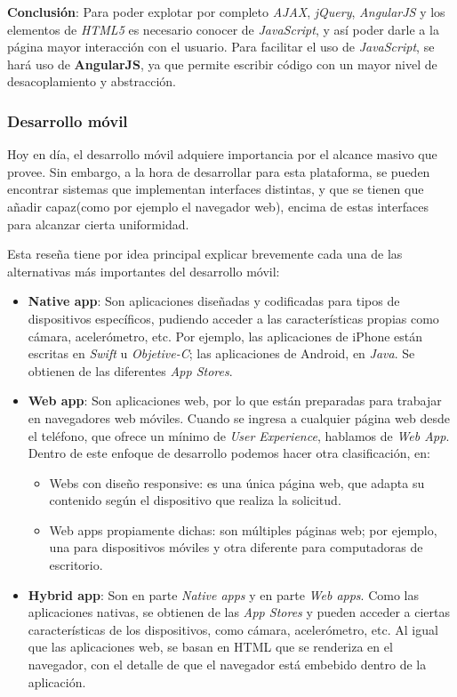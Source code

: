 \textbf{Conclusión}:
Para poder explotar por completo \textit{AJAX}, \textit{jQuery}, \textit{AngularJS} y los elementos de \textit{HTML5} es necesario conocer de \textit{JavaScript}, y así poder darle a la página mayor interacción con el usuario. 
Para facilitar el uso de \textit{JavaScript}, se hará uso de \textbf{AngularJS}, ya que permite escribir código con un mayor nivel de desacoplamiento y abstracción.


\subsubsection{Desarrollo móvil}

Hoy en día, el desarrollo móvil adquiere importancia por el alcance masivo que provee.
Sin embargo, a la hora de desarrollar para esta plataforma, se pueden encontrar sistemas que implementan interfaces distintas, y que se tienen que añadir capaz(como por ejemplo el navegador web), encima de estas interfaces para alcanzar cierta uniformidad.

Esta reseña tiene por idea principal explicar brevemente cada una de las alternativas más importantes del desarrollo móvil:

\begin{itemize}
\item \textbf{Native app}:
Son aplicaciones diseñadas y codificadas para tipos de dispositivos específicos, pudiendo acceder a las características propias como cámara, acelerómetro, etc.
Por ejemplo, las aplicaciones de iPhone están escritas en \textit{Swift} u \textit{Objetive-C}; las aplicaciones de Android, en \textit{Java}.
Se obtienen de las diferentes \textit{App Stores}.

\item \textbf{Web app}:
Son aplicaciones web, por lo que están preparadas para trabajar en navegadores web móviles.
Cuando se ingresa a cualquier página web desde el teléfono, que ofrece un mínimo de \textit{User Experience}, hablamos de \textit{Web App}.
Dentro de este enfoque de desarrollo podemos hacer otra clasificación, en: 
\begin{itemize}
    \item Webs con diseño responsive: es una única página web, que adapta su contenido según el dispositivo que realiza la solicitud.
    \item Web apps propiamente dichas: son múltiples páginas web; por ejemplo, una para dispositivos móviles y otra diferente para computadoras de escritorio.
\end{itemize}

\item \textbf{Hybrid app}:
Son en parte \textit{Native apps} y en parte \textit{Web apps}.
Como las aplicaciones nativas, se obtienen de las \textit{App Stores} y pueden acceder a ciertas características de los dispositivos, como cámara, acelerómetro, etc.
Al igual que las aplicaciones web, se basan en HTML que se renderiza en el navegador, con el detalle de que el navegador está embebido dentro de la aplicación.

\end{itemize}


